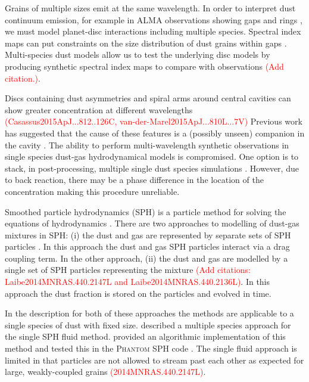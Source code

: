 \documentclass[fleqn,usenatbib]{mnras}
\begin{document}
Grains of multiple sizes emit at the same wavelength. In order to interpret dust
continuum emission, for example in ALMA observations showing gaps and rings
\citep{ALMAPartnership2015ApJ...808L...3A, Andrews2016ApJ...820L..40A}, we must
model planet-disc interactions including multiple species. Spectral index maps
can put constraints on the size distribution of dust grains within gaps
\citep{Huang2018ApJ...852..122H}. Multi-species dust models allow us to test the
underlying disc models by producing synthetic spectral index maps to compare
with observations \textcolor{red}{(Add citation.)}.

Discs containing dust asymmetries and spiral arms around central cavities can
show greater concentration at different wavelengths
\textcolor{red}{(Casassus2015ApJ...812..126C, van-der-Marel2015ApJ...810L...7V)}
Previous work has suggested that the cause of these features is a (possibly
unseen) companion in the cavity \citep{Price2018MNRAS.477.1270P,
Poblete2019MNRAS.489.2204P,Calcino2019MNRAS.490.2579C}. The ability to perform
multi-wavelength synthetic observations in single species dust-gas
hydrodynamical models is compromised. One option is to stack, in
post-processing, multiple single dust species simulations
\citep{Dipierro2015MNRAS.453L..73D, Mentiplay2019MNRAS.484L.130M}. However, due
to back reaction, there may be a phase difference in the location of the
concentration making this procedure unreliable.

Smoothed particle hydrodynamics (SPH) is a particle method for solving the
equations of hydrodynamics \citep{Monaghan1992ARA&A..30..543M,
Monaghan2005RPPh...68.1703M, Price2012JCoPh.231..759P}. There are two approaches
to modelling of dust-gas mixtures in SPH: (i) the dust and gas are represented
by separate sets of SPH particles \citep{Monaghan1995CoPhC..87..225M,
Laibe2012MNRAS.420.2345L, Laibe2012MNRAS.420.2365L}. In this approach the dust
and gas SPH particles interact via a drag coupling term. In the other approach,
(ii) the dust and gas are modelled by a single set of SPH particles representing
the mixture \citep{Laibe2014MNRAS.444.1940L, Price2015MNRAS.451..813P}
\textcolor{red}{(Add citations: Laibe2014MNRAS.440.2147L and
Laibe2014MNRAS.440.2136L)}. In this approach the dust fraction is stored on the
particles and evolved in time.

In the description for both of these approaches the methods are applicable to a
single species of dust with fixed size. \citet{Laibe2014MNRAS.444.1940L}
described a multiple species approach for the single SPH fluid method.
\citet{Hutchison2018MNRAS.476.2186H} provided an algorithmic implementation of
this method and tested this in the \textsc{Phantom} SPH code
\citep{Price2018PASA...35...31P}. The single fluid approach is limited in that
particles are not allowed to stream past each other as expected for large,
weakly-coupled grains \textcolor{red}{(2014MNRAS.440.2147L)}.
\end{document}
